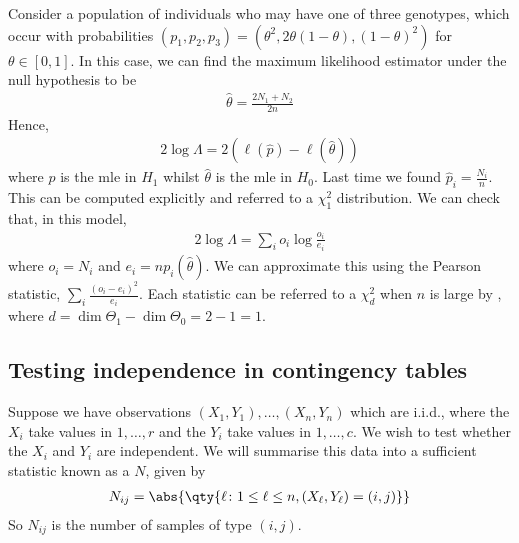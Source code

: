 \begin{example}
	Consider a population of individuals who may have one of three genotypes, which occur with probabilities $(p_1, p_2, p_3) = (\theta^2, 2\theta(1-\theta), (1-\theta)^2)$ for $\theta \in [0, 1]$.
	In this case, we can find the maximum likelihood estimator under the null hypothesis to be
	\begin{align*}
		\hat \theta = \frac{2N_1 + N_2}{2n}
	\end{align*}
	Hence,
	\begin{align*}
		2 \log \Lambda = 2(\ell(\hat p) - \ell(\hat \theta))
	\end{align*}
	where $\hat{p}$ is the mle in $H_1$ whilst $\hat{\theta}$ is the mle in $H_0$.
	Last time we found $\hat p_i = \frac{N_i}{n}$.
	This can be computed explicitly and referred to a $\chi^2_1$ distribution.
	We can check that, in this model,
	\begin{align*}
		2 \log \Lambda = \sum_i o_i \log \frac{o_i}{e_i}
	\end{align*}
	where $o_i = N_i$ and $e_i = n p_i(\hat \theta)$.
	We can approximate this using the Pearson statistic, $\sum_i \frac{(o_i - e_i)^2}{e_i}$.
	Each statistic can be referred to a $\chi^2_d$ when $n$ is large by , where $d = \dim \Theta_1 - \dim \Theta_0 = 2 - 1 = 1$.
\end{example}

\subsection{Testing independence in contingency tables}
Suppose we have observations $(X_1, Y_1), \dots, (X_n, Y_n)$ which are i.i.d., where the $X_i$ take values in $1, \dots, r$ and the $Y_i$ take values in $1, \dots, c$.
We wish to test whether the $X_i$ and $Y_i$ are independent.
We will summarise this data into a sufficient statistic known as a  $N$, given by
\begin{align*}
	N_{ij} = \abs{ \qty{\ell \colon 1 \leq \ell \leq n, (X_\ell, Y_\ell) = (i,j)} }
\end{align*}
So $N_{ij}$ is the number of samples of type $(i,j)$.

